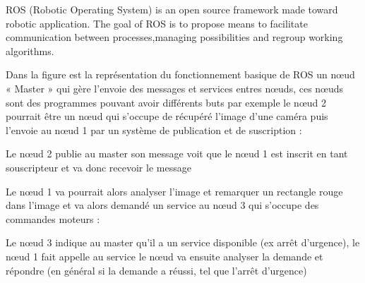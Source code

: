 ROS (Robotic Operating System) is an open source framework made toward robotic application.
The goal of ROS is to propose means to facilitate communication between processes,managing possibilities
and regroup working algorithms.

Dans la figure est la représentation du fonctionnement basique de ROS un nœud « Master » qui gère l’envoie des messages et services entres nœuds, ces nœuds sont des programmes pouvant avoir différents buts par exemple le nœud 2 pourrait être un nœud qui s’occupe de récupéré l’image d’une caméra puis l’envoie au nœud 1 par un système de publication et de suscription :

Le nœud 2 publie au master son message voit que le nœud 1 est inscrit en tant souscripteur et va donc recevoir le message

Le nœud 1 va pourrait alors analyser l’image et remarquer un rectangle rouge dans l’image et va alors demandé un service au nœud 3 qui s’occupe des commandes moteurs :

Le nœud 3 indique au master qu’il a un service disponible (ex arrêt d’urgence), le nœud 1 fait appelle au service le nœud va ensuite analyser la demande et répondre (en général si la demande a réussi, tel que l’arrêt d’urgence) 